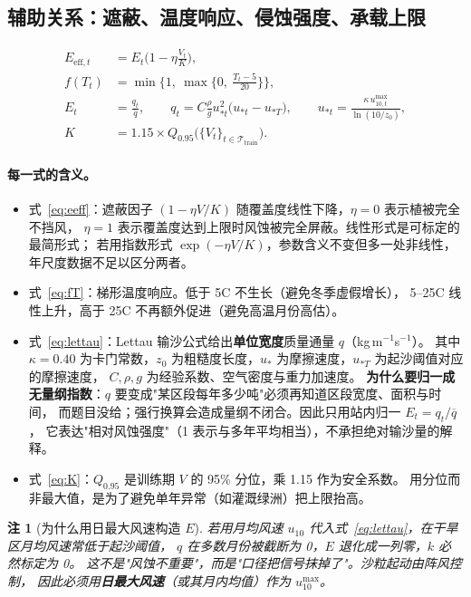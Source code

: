 \documentclass[11pt,a4paper]{ctexart}
\newtheorem{remark}{注}
\begin{document}
\subsection{辅助关系：遮蔽、温度响应、侵蚀强度、承载上限}

\begin{align}
E_{\mathrm{eff},t}&=E_t\Big(1-\eta\frac{V_t}{K}\Big),\label{eq:eeff}\\
f(T_t)&=\min\Big\{1,\ \max\Big\{0,\ \frac{T_t-5}{20}\Big\}\Big\},\label{eq:fT}\\
E_t&=\frac{q_t}{\overline{q}},\qquad
q_t=C\frac{\rho}{g}u_{*t}^{2}\big(u_{*t}-u_{*T}\big),\qquad
u_{*t}=\frac{\kappa\,u_{10,t}^{\max}}{\ln(10/z_0)},\label{eq:lettau}\\
K&=1.15\times Q_{0.95}\big(\{V_t\}_{t\in\mathcal{T}_{\mathrm{train}}}\big).\label{eq:K}
\end{align}

\paragraph{每一式的含义。}
\begin{itemize}
\item 式~\eqref{eq:eeff}：遮蔽因子 $(1-\eta V/K)$ 随覆盖度线性下降，$\eta=0$ 表示植被完全不挡风，
$\eta=1$ 表示覆盖度达到上限时风蚀被完全屏蔽。线性形式是可标定的最简形式；
若用指数形式 $\exp(-\eta V/K)$，参数含义不变但多一处非线性，年尺度数据不足以区分两者。
\item 式~\eqref{eq:fT}：梯形温度响应。低于 5\textdegree C 不生长（避免冬季虚假增长），
5--25\textdegree C 线性上升，高于 25\textdegree C 不再额外促进（避免高温月份高估）。
\item 式~\eqref{eq:lettau}：Lettau 输沙公式给出\textbf{单位宽度}质量通量 $q$（kg\,m$^{-1}$s$^{-1}$）。
其中 $\kappa=0.40$ 为卡门常数，$z_0$ 为粗糙度长度，$u_{*}$ 为摩擦速度，$u_{*T}$ 为起沙阈值对应的摩擦速度，
$C,\rho,g$ 为经验系数、空气密度与重力加速度。
\textbf{为什么要归一成无量纲指数}：$q$ 要变成"某区段每年多少吨"必须再知道区段宽度、面积与时间，
而题目没给；强行换算会造成量纲不闭合。因此只用站内归一 $E_t=q_t/\overline q$，
它表达"相对风蚀强度"（1 表示与多年平均相当），不承担绝对输沙量的解释。
\item 式~\eqref{eq:K}：$Q_{0.95}$ 是训练期 $V$ 的 95\% 分位，乘 1.15 作为安全系数。
用分位而非最大值，是为了避免单年异常（如灌溉绿洲）把上限抬高。
\end{itemize}

\begin{remark}[为什么用日最大风速构造 $E$]
若用月均风速 $u_{10}$ 代入式~\eqref{eq:lettau}，在干旱区月均风速常低于起沙阈值，
$q$ 在多数月份被截断为 0，$E$ 退化成一列零，$k$ 必然标定为 0。
这不是"风蚀不重要"，而是"口径把信号抹掉了"。沙粒起动由阵风控制，
因此必须用\textbf{日最大风速}（或其月内均值）作为 $u_{10}^{\max}$。
\end{remark}
\end{document}
